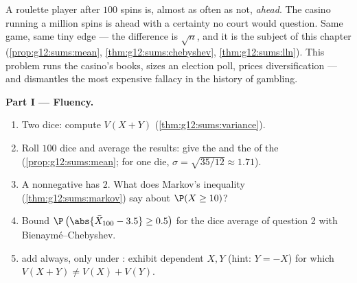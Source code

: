 \begin{problem}
\label{pb:g12:sums:1}
A roulette player after $100$ spins is, almost as often as not,
\emph{ahead}. The casino running a million spins is ahead with a
certainty no court would question. Same game, same tiny edge ---
the difference is $\sqrt n$, and it is the subject of this
chapter (\cref{prop:g12:sums:mean},
\cref{thm:g12:sums:chebyshev}, \cref{thm:g12:sums:lln}). This
problem runs the casino's books, sizes an election poll, prices
diversification --- and dismantles the most expensive fallacy in
the history of gambling.

\medskip
\noindent\textbf{Part I --- Fluency.}
\begin{enumerate}
  \item Two  dice: compute $V(X + Y)$
        (\cref{thm:g12:sums:variance}).
  \item Roll $100$  dice and average the results:
        give the  and the  of the
         (\cref{prop:g12:sums:mean}; for one die,
        $\sigma = \sqrt{35/12} \approx 1.71$).
  \item A nonnegative  has  $2$.
        What does Markov's inequality
        (\cref{thm:g12:sums:markov}) say about
        $\P(X \geq 10)$?
  \item Bound $\P\left(\abs{\bar X_{100} - 3.5} \geq
        0.5\right)$ for the dice average of question 2 with
        Bienaym\'e--Chebyshev.
  \item {} add always,  only under
        : exhibit dependent $X, Y$ (hint:
        $Y = -X$) for which
        $V(X + Y) \neq V(X) + V(Y)$.
\end{enumerate}


\end{problem}
